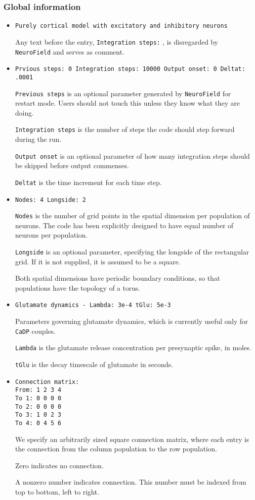 \documentclass[12pt,a4paper]{article}
\newcommand{\type}[1]{ {\small\small\tt #1} }
\begin{document}
\subsubsection{Global information}
\label{sec:global}
\begin{itemize}

\item
\begin{lstlisting}
Purely cortical model with excitatory and inhibitory neurons
\end{lstlisting}
Any text before the entry, \type{Integration steps:}, is disregarded by \type{NeuroField} and serves as comment.
\item
\begin{lstlisting}
Prvious steps: 0 Integration steps: 10000 Output onset: 0 Deltat: .0001 
\end{lstlisting}
\type{Previous steps} is an optional parameter generated by \type{NeuroField} for restart mode. Users should not touch this unless they know what they are doing.

\type{Integration steps} is the number of steps the code should step forward during the run.

\type{Output onset} is an optional parameter of how many integration steps should be skipped before output commenses.

\type{Deltat} is the time increment for each time step.
\item
\begin{lstlisting}
Nodes: 4 Longside: 2
\end{lstlisting}
\type{Nodes} is the number of grid points in the spatial dimension per population of neurons. The code has been explicitly designed to have equal number of neurons per population.

\type{Longside} is an optional parameter, specifying the longside of the rectangular grid. If it is not supplied, it is assumed to be a square.

Both spatial dimensions have periodic boundary conditions, so that populations have the topology of a torus.
\item
\begin{lstlisting}
Glutamate dynamics - Lambda: 3e-4 tGlu: 5e-3
\end{lstlisting}
Parameters governing glutamate dynamics, which is currently useful only for \type{CaDP} couples.

\type{Lambda} is the glutamate release concentration per presynaptic spike, in moles.

\type{tGlu} is the decay timescale of glutamate in seconds.
\item
\begin{lstlisting}
Connection matrix:
From: 1 2 3 4
To 1: 0 0 0 0
To 2: 0 0 0 0
To 3: 1 0 2 3
To 4: 0 4 5 6
\end{lstlisting}
We specify an arbitrarily sized square connection matrix, where each entry is the connection from the column population to the row population.

Zero indicates no connection.

A nonzero number indicates connection. This number must be indexed from top to bottom, left to right.
\end{itemize}
\end{document}
